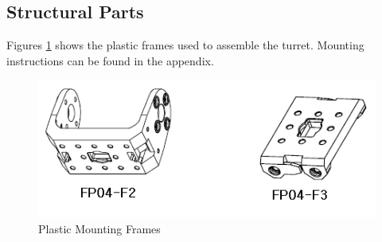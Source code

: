 \subsection{Structural Parts}
Figures \ref{fig:axFrames} shows the plastic frames used to assemble the turret. Mounting instructions can be found in the appendix. 
\begin{figure}
	\centering
	\includegraphics[width=\textwidth]{img/axFrames.png}%
	\caption{Plastic Mounting Frames}
	\label{fig:axFrames}
\end{figure}

